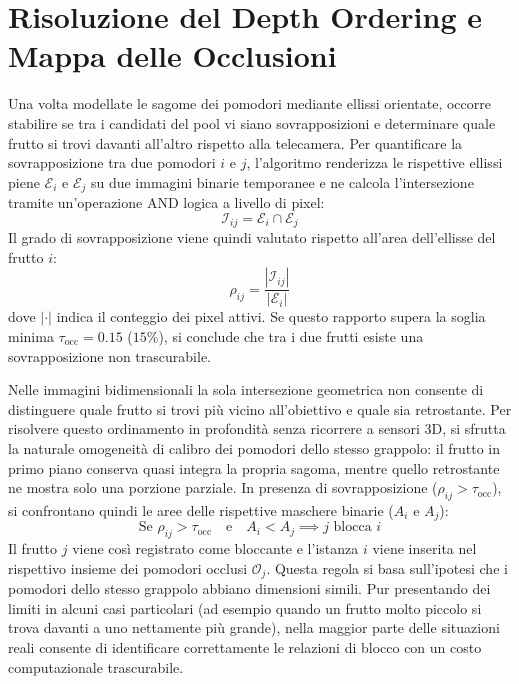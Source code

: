 \section{Risoluzione del Depth Ordering e Mappa delle Occlusioni}
\label{sec:depth_ordering}

Una volta modellate le sagome dei pomodori mediante ellissi orientate, occorre stabilire se tra i candidati del pool vi siano sovrapposizioni e determinare quale frutto si trovi davanti all'altro rispetto alla telecamera.
Per quantificare la sovrapposizione tra due pomodori $i$ e $j$, l'algoritmo renderizza le rispettive ellissi piene $\mathcal{E}_i$ e $\mathcal{E}_j$ su due immagini binarie temporanee e ne calcola l'intersezione tramite un'operazione AND logica a livello di pixel:
\begin{equation}
    \mathcal{I}_{ij} = \mathcal{E}_i \cap \mathcal{E}_j
    \label{eq:intersezione_ellissi}
\end{equation}
Il grado di sovrapposizione viene quindi valutato rispetto all'area dell'ellisse del frutto $i$:
\begin{equation}
    \rho_{ij} = \frac{|\mathcal{I}_{ij}|}{|\mathcal{E}_i|}
    \label{eq:overlap_ratio}
\end{equation}
dove $|\cdot|$ indica il conteggio dei pixel attivi. Se questo rapporto supera la soglia minima $\tau_{\text{occ}} = 0.15$ ($15\%$), si conclude che tra i due frutti esiste una sovrapposizione non trascurabile.

Nelle immagini bidimensionali la sola intersezione geometrica non consente di distinguere quale frutto si trovi più vicino all'obiettivo e quale sia retrostante. Per risolvere questo ordinamento in profondità senza ricorrere a sensori 3D, si sfrutta la naturale omogeneità di calibro dei pomodori dello stesso grappolo: il frutto in primo piano conserva quasi integra la propria sagoma, mentre quello retrostante ne mostra solo una porzione parziale.
In presenza di sovrapposizione ($\rho_{ij} > \tau_{\text{occ}}$), si confrontano quindi le aree delle rispettive maschere binarie ($A_i$ e $A_j$):
\begin{equation}
    \text{Se } \rho_{ij} > \tau_{\text{occ}} \quad \text{e} \quad A_i < A_j \implies j \text{ blocca } i
    \label{eq:regola_occlusione}
\end{equation}
Il frutto $j$ viene così registrato come bloccante e l'istanza $i$ viene inserita nel rispettivo insieme dei pomodori occlusi $\mathcal{O}_j$.
Questa regola si basa sull'ipotesi che i pomodori dello stesso grappolo abbiano dimensioni simili. Pur presentando dei limiti in alcuni casi particolari (ad esempio quando un frutto molto piccolo si trova davanti a uno nettamente più grande), nella maggior parte delle situazioni reali consente di identificare correttamente le relazioni di blocco con un costo computazionale trascurabile.

